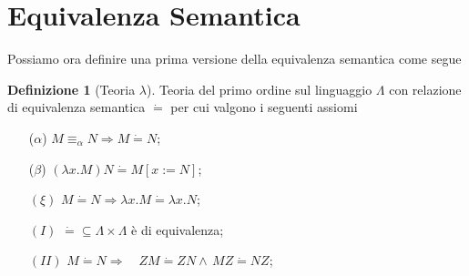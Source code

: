 \documentclass[a4paper,11pt]{article}
\theoremstyle{definition}
\newtheorem{defn}{Definizione}
\begin{document}
\section{Equivalenza Semantica}
Possiamo ora definire una prima versione della equivalenza semantica come segue
\begin{defn}[Teoria $\lambda$]
  Teoria del primo ordine sul linguaggio $\Lambda$ con relazione di equivalenza semantica 
  $\dot =$ per cui valgono i seguenti assiomi
  \begin{itemize}
    \item[($\alpha$)] $M\equiv_\alpha N \Rightarrow M \dot = N$;
    \item[($\beta$)] $(\lambda x.M)N \dot = M[x:=N]$;
    \item[$(\xi)$] $M\dot = N \Rightarrow \lambda x.M \dot = \lambda x.N$;
    \item[$(I)$] $\dot = \subseteq \Lambda\times\Lambda$ è di equivalenza;
    \item[$(II)$] $M\dot = N \Rightarrow \quad ZM\dot =ZN \wedge\, MZ\dot
      =NZ$;
  \end{itemize}
\end{defn}
\end{document}
